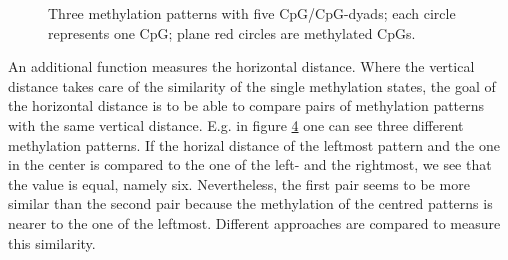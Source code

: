 \begin{figure}[h]
\begin{subfigure}{\textwidth}
\centering
{}
\label{sfig:0}
\caption{}
\end{subfigure}
\begin{subfigure}{\textwidth}
\centering
{}
\label{sfig:1}
\caption{}
\end{subfigure}
\begin{subfigure}{\textwidth}
\centering
{}
\label{sfig:2}
\caption{}
\end{subfigure}
\caption{Three methylation patterns with five CpG/CpG-dyads; each circle represents one CpG; plane red circles are methylated CpGs.}
\label{fig:vertical}
\end{figure}
An additional function measures the horizontal distance. Where the vertical distance takes care of the similarity of the single methylation states, the goal of the horizontal distance is to be able to compare pairs of methylation patterns with the same vertical distance. E.g. in figure \ref{fig:vertical} one can see three different methylation patterns. If the horizal distance of the leftmost pattern and the one in the center is compared to the one of the left- and the rightmost, we see that the value is equal, namely six. Nevertheless, the first pair seems to be more similar than the second pair because the methylation of the centred patterns is nearer to the one of the leftmost. Different approaches are compared to measure this similarity.\newline
